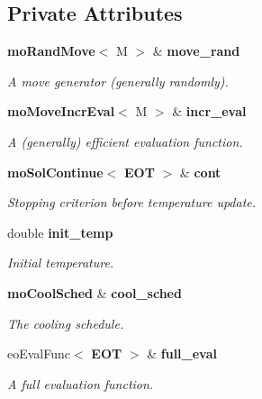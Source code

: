 \subsection*{Private Attributes}
\begin{CompactItemize}
\item 
{\bf mo\-Rand\-Move}$<$ M $>$ \& {\bf move\_\-rand}\label{classmo_s_a_71c49935b63a202d25888a5f86121fec}

\begin{CompactList}\small\item\em A move generator (generally randomly). \item\end{CompactList}\item 
{\bf mo\-Move\-Incr\-Eval}$<$ M $>$ \& {\bf incr\_\-eval}\label{classmo_s_a_4c3be32e9832e465b24e6d33559356bc}

\begin{CompactList}\small\item\em A (generally) efficient evaluation function. \item\end{CompactList}\item 
{\bf mo\-Sol\-Continue}$<$ {\bf EOT} $>$ \& {\bf cont}\label{classmo_s_a_54484c8a514866ea496e0058c2e09716}

\begin{CompactList}\small\item\em Stopping criterion before temperature update. \item\end{CompactList}\item 
double {\bf init\_\-temp}\label{classmo_s_a_f1af7636b52aa5f6b381f8187b667bd4}

\begin{CompactList}\small\item\em Initial temperature. \item\end{CompactList}\item 
{\bf mo\-Cool\-Sched} \& {\bf cool\_\-sched}\label{classmo_s_a_c7aaf7424aa1b9f889d2ba9c959e5a1d}

\begin{CompactList}\small\item\em The cooling schedule. \item\end{CompactList}\item 
eo\-Eval\-Func$<$ {\bf EOT} $>$ \& {\bf full\_\-eval}\label{classmo_s_a_bcd6a940046f23dd741444c0b85edf2c}

\begin{CompactList}\small\item\em A full evaluation function. \item\end{CompactList}\end{CompactItemize}


